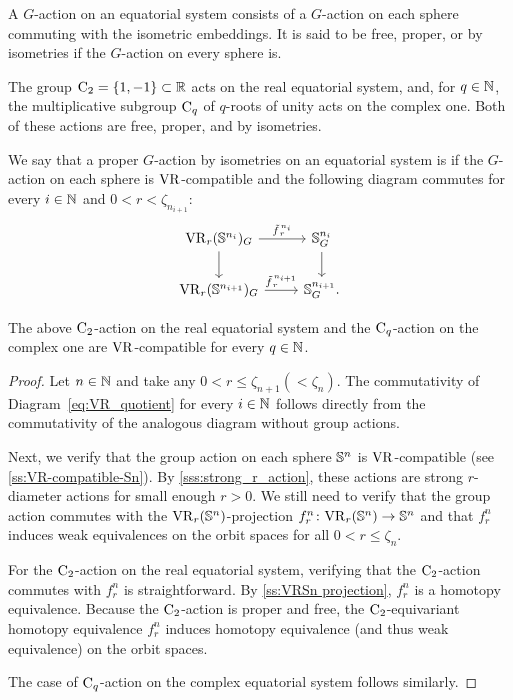 A \(G\)-action on an equatorial system consists of a \(G\)-action on each sphere commuting with the isometric embeddings.
It is said to be free, proper, or by isometries if the \(G\)-action on every sphere is.

The group \(\mathrm{C}_2 = \{1,-1\} \subset \mathbb{R}\) acts on the real equatorial system, and, for \(q \in \mathbb{N}\), the multiplicative subgroup \(\mathrm{C}_q\) of \(q\)-roots of unity acts on the complex one.
Both of these actions are free, proper, and by isometries.

We say that a proper \(G\)-action by isometries on an equatorial system is  if the \(G\)-action on each sphere is \(\mathrm{VR}\)-compatible and the following diagram commutes for every \(i \in \mathbb{N}\) and $0 < r < \zeta_{n_{i+1}}$:
\begin{equation}\label{eq:VR_quotient}
    \begin{tikzcd}
	\VR_r(\bS^{n_i})_G
	\ar[d]
	\ar[r, "\tilde f_{\,r}^{\,n_i}" above]
	&
	\bS^{n_i}_G
	\ar[d]
	\\
	\VR_r(\bS^{n_{i+1}})_G
	\ar[r, "\tilde f_{\,r}^{\,n_{i+1}}" above]
	&
	\bS^{n_{i+1}}_G.
\end{tikzcd}
\end{equation}

\lemma The above \(\mathrm{C}_2\)-action on the real equatorial system and the \(\mathrm{C}_q\)-action on the complex one are \(\mathrm{VR}\)-compatible for every \(q \in \mathbb{N}\).

\begin{proof}
    Let $n \in \mathbb{N}$ and take any $0 < r \leq \zeta_{n+1} (< \zeta_{n})$.
    The commutativity of Diagram~\ref{eq:VR_quotient} for every $i \in \mathbb{N}$ follows directly from the commutativity of the analogous diagram without group actions.

    Next, we verify that the group action on each sphere $\mathbb{S}^n$ is \(\mathrm{VR}\)-compatible (see \cref{ss:VR-compatible-Sn}).
    By \cref{sss:strong_r_action}, these actions are strong \(r\)-diameter actions for small enough $r>0$.
    We still need to verify that the group action commutes with the $\mathrm{VR}_r(\mathbb{S}^{n})$-projection $f_r^{n}\colon \mathrm{VR}_r(\mathbb{S}^{n}) \to \mathbb{S}^{n}$ and that $f_r^{n}$ induces weak equivalences on the orbit spaces for all $0 < r \leq \zeta_{n}$.

    For the $\mathrm{C}_2$-action on the real equatorial system, verifying that the $\mathrm{C}_2$-action commutes with $f_r^{n}$ is straightforward.
    By \cref{ss:VRSn projection}, $f_r^{n}$ is a homotopy equivalence.
    Because the $\mathrm{C}_2$-action is proper and free, the $\mathrm{C}_2$-equivariant homotopy equivalence $f_r^n$ induces homotopy equivalence (and thus weak equivalence) on the orbit spaces.

    The case of $\mathrm{C}_q$-action on the complex equatorial system follows similarly.
\end{proof}

